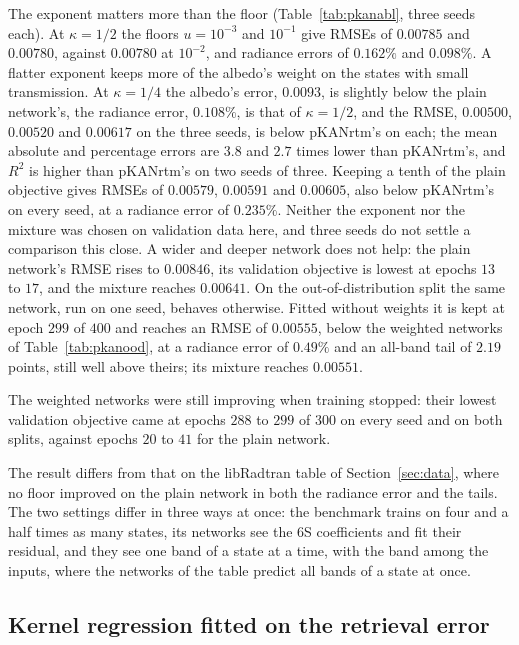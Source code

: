 \documentclass[11pt]{article}
\theoremstyle{remark}
\newcommand{\1}{\mathbf{1}}
\begin{document}
The exponent matters more than the floor (Table~\ref{tab:pkanabl}, three seeds each). At $\kappa=1/2$ the floors
$u=10^{-3}$ and $10^{-1}$ give RMSEs of $0.00785$ and $0.00780$, against $0.00780$ at $10^{-2}$, and radiance errors of
$0.162\%$ and $0.098\%$. A flatter exponent keeps more of the albedo's weight on the states with small transmission. At
$\kappa=1/4$ the albedo's error, $0.0093$, is slightly below the plain network's, the radiance error, $0.108\%$, is
that of $\kappa=1/2$, and the RMSE, $0.00500$, $0.00520$ and $0.00617$ on the three seeds, is below pKANrtm's on each;
the mean absolute and percentage errors are $3.8$ and $2.7$ times lower than pKANrtm's, and $R^2$ is higher than
pKANrtm's on two seeds of three. Keeping a tenth of the plain objective gives RMSEs of $0.00579$, $0.00591$ and
$0.00605$, also below pKANrtm's on every seed, at a radiance error of $0.235\%$. Neither the exponent nor the mixture was
chosen on validation data here, and three seeds do not settle a comparison this close. A wider and deeper network does
not help: the plain network's RMSE rises to $0.00846$, its validation objective is lowest at epochs $13$ to $17$, and
the mixture reaches $0.00641$. On the out-of-distribution split the same network, run on one seed, behaves otherwise.
Fitted without weights it is kept at epoch $299$ of $400$ and reaches an RMSE of $0.00555$, below the weighted networks
of Table~\ref{tab:pkanood}, at a radiance error of $0.49\%$ and an all-band tail of $2.19$ points, still well above
theirs; its mixture reaches $0.00551$.

The weighted networks were still improving when training stopped: their lowest validation objective came at epochs
$288$ to $299$ of $300$ on every seed and on both splits, against epochs $20$ to $41$ for the plain network.

The result differs from that on the libRadtran table of Section~\ref{sec:data}, where no floor improved on the plain
network in both the radiance error and the tails. The two settings differ in three ways at once: the benchmark trains
on four and a half times as many states, its networks see the 6S coefficients and fit their residual, and they see one
band of a state at a time, with the band among the inputs, where the networks of the table predict all bands of a state
at once.

\subsection{Kernel regression fitted on the retrieval error}\label{sec:kernelfit}
\end{document}
